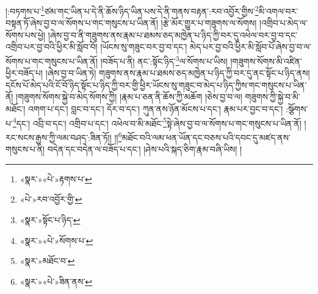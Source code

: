 །:བཏགས་པ་\footnote{«སྣར་»«པེ་»རྟགས་པ་}ཙམ་གང་ཡིན་པ་དེ་ནི་ཆོས་ཉིད་ཡིན་པས་དེ་ནི་གནས་བརྟན་:རབ་འབྱོར་གྱིས་\footnote{«པེ་»རབ་འབྱོར་གྱི་}མི་འགལ་བར་བསྟན་ཏོ་ཞེས་བྱ་བ་ལ་སོགས་པ་གང་གསུངས་པ་ཡིན་ནོ། །རྩེ་མོར་གྱུར་པ་གཟུགས་ལ་སོགས། །འགྲིབ་པ་མེད་ལ་སོགས་པས་ཕྱེ། །ཞེས་བྱ་བ་ནི་གཟུགས་ནས་རྣམ་པ་ཐམས་ཅད་མཁྱེན་པ་ཉིད་ཀྱི་བར་དུ་འཕེལ་བར་བྱ་བ་དང་འགྲིབ་པར་བྱ་བའི་ཕྱིར་མི་སློབ་བོ། །ཡོངས་སུ་གཟུང་བར་བྱ་བ་དང་། མེད་པར་བྱ་བའི་ཕྱིར་མི་སློབ་པོ་ཞེས་བྱ་བ་ལ་སོགས་པ་གང་གསུངས་པ་ཡིན་ནོ། །བཟོད་པ་ནི། ནང་:སྟོང་ཉིད་\footnote{«སྣར་»སྟོང་པ་ཉིད་}ལ་སོགས་པ་ཡིས། །གཟུགས་སོགས་མི་འཛིན་ཕྱིར་བཟོད་པ། །ཞེས་བྱ་བ་ཡིན་ཏེ། གཟུགས་ནས་རྣམ་པ་ཐམས་ཅད་མཁྱེན་པ་ཉིད་ཀྱི་བར་དུ་ནང་སྟོང་པ་ཉིད་ནས། དངོས་པོ་མེད་པའི་ངོ་བོ་ཉིད་སྟོང་པ་ཉིད་ཀྱི་བར་གྱི་ཕྱིར་ཡོངས་སུ་གཟུང་བ་མེད་པ་ཉིད་ཀྱིས་གང་གསུངས་པ་ཡིན་ནོ། །གཟུགས་སོགས་སྐྱེ་བ་མེད་སོགས་ཀྱི། །རྣམ་པ་ཅན་ནི་ཆོས་ཀྱི་མཆོག །ཅེས་བྱ་བ་ལ། གཟུགས་ཀྱི་སྐྱེ་བ་མི་མཐོང་། འགག་པ་དང་། བླང་བ་དང་། དོར་བ་དང་། ཀུན་ནས་ཉོན་མོངས་པ་དང་། རྣམ་པར་བྱང་བ་དང་། :སྩོགས་པ་\footnote{«སྣར་»«པེ་»སོགས་པ་}དང་། འབྲི་བ་དང་། འགྲིབ་པ་དང་། འཕེལ་བ་མི་མཐོང་\footnote{«སྣར་»མཐོང་བ་}སྟེ་ཞེས་བྱ་བ་ལ་སོགས་པ་གང་གསུངས་པ་ཡིན་ནོ། །རང་སངས་རྒྱས་ཀྱི་ལམ་བཤད་:ཟིན་ཏོ།། །།\footnote{«སྣར་»«པེ་»ཟིན་ནས་}མཐོང་བའི་ལམ་ཕན་ཡོན་དང་བཅས་པའི་དབང་དུ་མཛད་ནས་གསུངས་པ་ནི། བདེན་དང་བདེན་ལ་བཟོད་པ་དང་། །ཤེས་པའི་སྐད་ཅིག་རྣམ་བཞི་ཡིས། །
